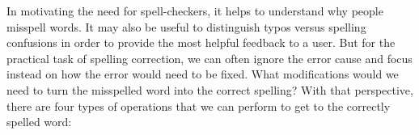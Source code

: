 


In motivating the need for spell-checkers, it helps to understand why people misspell words.  It may also be useful to distinguish typos versus spelling confusions in order to provide the most helpful feedback to a user. 
 But for the practical task of spelling correction, we can often ignore the error cause and focus instead on how the error would need to be fixed. What modifications would we need to  turn the misspelled word into the correct spelling? With that perspective, there are four types of operations that we can perform to get to the correctly spelled word:


